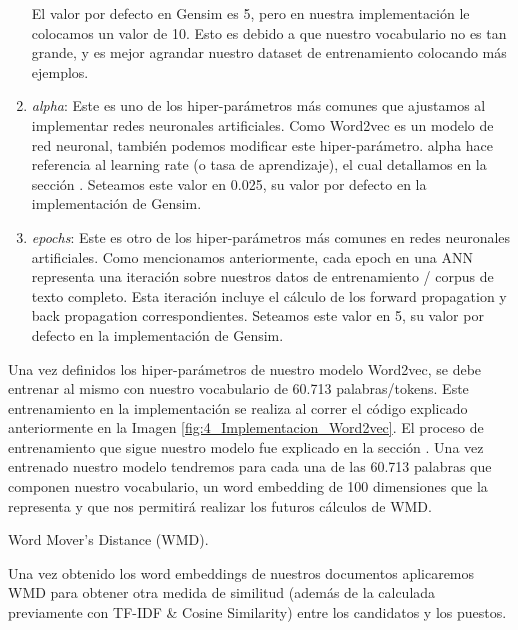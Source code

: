 \documentclass[12pt,a4paper]{article}
\makeatletter
\renewcommand\paragraph{\@startsection{paragraph}{4}{\z@}
            {-2.5ex\@plus -1ex \@minus -.25ex}
            {1.25ex \@plus .25ex}
            {\normalfont\normalsize\bfseries}}
\makeatother
\begin{document}
\begin{sloppypar}
\begin{enumerate}
El valor por defecto en Gensim es 5, pero en nuestra implementación le colocamos un valor de 10. Esto es debido a que nuestro vocabulario no es tan grande, y es mejor agrandar nuestro dataset de entrenamiento colocando más ejemplos.

\item \textit{alpha}: Este es uno de los hiper-parámetros más comunes que ajustamos al implementar redes neuronales artificiales. Como Word2vec es un modelo de red neuronal, también podemos modificar este hiper-parámetro. alpha hace referencia al learning rate (o tasa de aprendizaje), el cual detallamos en la sección \textit{}. Seteamos este valor en 0.025, su valor por defecto en la implementación de Gensim.

\item \textit{epochs}: Este es otro de los hiper-parámetros más comunes en redes neuronales artificiales. Como mencionamos anteriormente, cada epoch en una ANN representa una iteración sobre nuestros datos de entrenamiento / corpus de texto completo. Esta iteración incluye el cálculo de los forward propagation y back propagation correspondientes. Seteamos este valor en 5, su valor por defecto en la implementación de Gensim.

\end{enumerate}

Una vez definidos los hiper-parámetros de nuestro modelo Word2vec, se debe entrenar al mismo con nuestro vocabulario de 60.713 palabras/tokens. Este entrenamiento en la implementación se realiza al correr el código explicado anteriormente en la Imagen \ref{fig:4_Implementacion_Word2vec}. El proceso de entrenamiento que sigue nuestro modelo fue explicado en la sección \textit{}. Una vez entrenado nuestro modelo tendremos para cada una de las 60.713 palabras que componen nuestro vocabulario, un word embedding de 100 dimensiones que la representa y que nos permitirá realizar los futuros cálculos de WMD. 

\cleardoublepage

\paragraph{Word Mover's Distance (WMD).}\label{calculo_wmd}

Una vez obtenido los word embeddings de nuestros documentos aplicaremos WMD para obtener otra medida de similitud (además de la calculada previamente con TF-IDF \& Cosine Similarity) entre los candidatos y los puestos.


\end{sloppypar}
\end{document}
